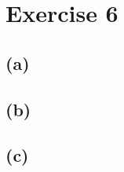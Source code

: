 \documentclass[a4paper]{article}
\begin{document}
\newpage
\section{Exercise 6}
\subsection{(a)}

\subsection{(b)}

\subsection{(c)}

\newpage
\printbibliography[heading=bibintoc]
\end{document}
